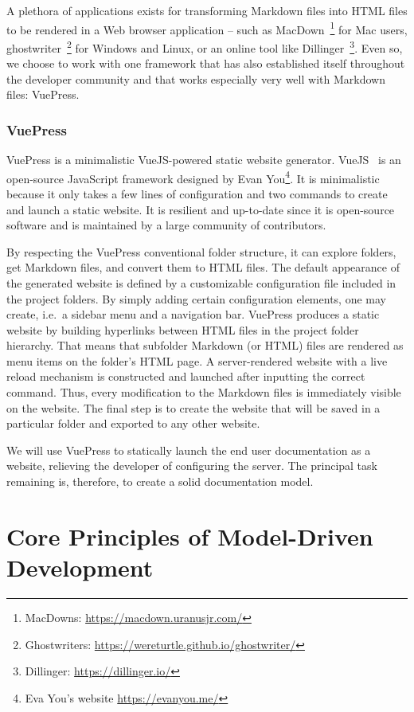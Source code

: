 A plethora of applications exists for transforming Markdown files into HTML files to be rendered in a Web browser application -- such as MacDown~\footnote[1]{MacDowns: \url{https://macdown.uranusjr.com/}} for Mac users, ghostwriter~\footnote[2]{Ghostwriters: \url{https://wereturtle.github.io/ghostwriter/}} for Windows and Linux, or an online tool like Dillinger~\footnote[3]{Dillinger: \url{https://dillinger.io/}}. Even so, we choose to work with one framework that has also established itself throughout the developer community and that works especially very well with Markdown files: VuePress.

\subsubsection{VuePress}\label{sec:VP}

VuePress is a minimalistic VueJS-powered static website generator. VueJS~\cite{vuepress} is an open-source JavaScript framework designed by Evan You\footnote[4]{Eva You's website \url{https://evanyou.me/}}. It is minimalistic because it only takes a few lines of configuration and two commands to create and launch a static website. It is resilient and up-to-date since it is open-source software and is maintained by a large community of contributors.

By respecting the VuePress conventional folder structure, it can explore folders, get Markdown files, and convert them to HTML files. The default appearance of the generated website is defined by a customizable configuration file included in the project folders. By simply adding certain configuration elements, one may create, i.e.~a sidebar menu and a navigation bar. VuePress produces a static website by building hyperlinks between HTML files in the project folder hierarchy. That means that subfolder Markdown (or HTML) files are rendered as menu items on the folder's HTML page. A server-rendered website with a live reload mechanism is constructed and launched after inputting the correct command. Thus, every modification to the Markdown files is immediately visible on the website. The final step is to create the website that will be saved in a particular folder and exported to any other website.

We will use VuePress to statically launch the end user documentation as a website, relieving the developer of configuring the server. The principal task remaining is, therefore, to create a solid documentation model.


\section{Core Principles of Model-Driven Development}\label{sec:mdd}

